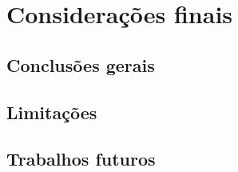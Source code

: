 \chapter{Considerações finais}


\section{Conclusões gerais}

\section{Limitações}

\section{Trabalhos futuros}

